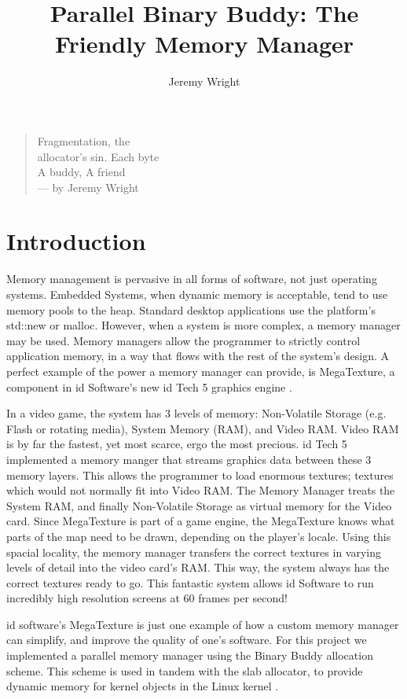 \documentclass[12pt]{article}
\title{Parallel Binary Buddy: The Friendly Memory Manager}
\author{Jeremy Wright}
\begin{document}
\maketitle

\begin{verse}
Fragmentation, the\\
allocator's sin. Each byte\\
A buddy, A friend\\
--- by Jeremy Wright
\end{verse}

\section{Introduction}
Memory management is pervasive in all forms of software, not just operating
systems. Embedded Systems, when dynamic memory is acceptable, tend to use memory
pools to the heap.  Standard desktop applications use the platform's std::new or 
malloc.  However, when a system is more complex, a memory manager may be used.
Memory managers allow the programmer 
to strictly control application memory, in a way that flows with the rest of the
system's design.  A perfect example of the power a memory manager can provide,
is MegaTexture, a component in id Software's new id Tech 5 graphics engine \cite{SIGGRAPH2009}.  

In a video game, the system has 3 levels of
memory:  Non-Volatile Storage (e.g. Flash or rotating media), 
System Memory (RAM), and Video RAM.  Video RAM is
by far the fastest, yet most scarce, ergo the most precious.  id Tech
5 implemented a memory manger that streams graphics data between these 3 memory
layers.  This allows the programmer to load enormous textures;
textures which would not normally fit into Video RAM.  The Memory Manager treats
the System RAM, and finally Non-Volatile Storage as virtual memory for the Video card.
Since MegaTexture is part of a game engine, the MegaTexture knows what parts of
the map need to be drawn, depending on the player's locale.  
Using this spacial locality, the memory manager transfers the correct textures in
varying levels of detail into the video card's RAM. This way, the system always has the
correct textures ready to go.  This fantastic system allows id Software to run
incredibly high resolution screens at 60 frames per second!

id software's MegaTexture is just one example of how a custom memory manager can
simplify, and improve the quality of one's software.  For this project we 
implemented a parallel memory manager using the Binary Buddy allocation scheme.  This
 scheme is used in tandem with the slab allocator, to provide dynamic
memory for kernel objects in the Linux kernel \cite[p.~134]{kalloc}.
\end{document}
